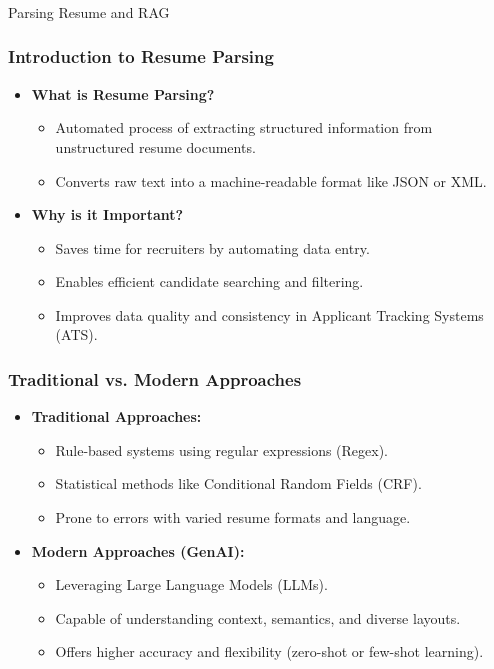 \begin{frame}[fragile]\frametitle{}
\begin{center}
{\Large Parsing Resume and RAG}

\end{center}
\end{frame}


\begin{frame}[fragile]\frametitle{Introduction to Resume Parsing}
    \begin{itemize}
        \item \textbf{What is Resume Parsing?}
        \begin{itemize}
            \item Automated process of extracting structured information from unstructured resume documents.
            \item Converts raw text into a machine-readable format like JSON or XML.
        \end{itemize}
        \item \textbf{Why is it Important?}
        \begin{itemize}
            \item Saves time for recruiters by automating data entry.
            \item Enables efficient candidate searching and filtering.
            \item Improves data quality and consistency in Applicant Tracking Systems (ATS).
        \end{itemize}
    \end{itemize}
\end{frame}

\begin{frame}[fragile]\frametitle{Traditional vs. Modern Approaches}
    \begin{itemize}
        \item \textbf{Traditional Approaches:}
        \begin{itemize}
            \item Rule-based systems using regular expressions (Regex).
            \item Statistical methods like Conditional Random Fields (CRF).
            \item Prone to errors with varied resume formats and language.
        \end{itemize}
        \item \textbf{Modern Approaches (GenAI):}
        \begin{itemize}
            \item Leveraging Large Language Models (LLMs).
            \item Capable of understanding context, semantics, and diverse layouts.
            \item Offers higher accuracy and flexibility (zero-shot or few-shot learning).
        \end{itemize}
    \end{itemize}
\end{frame}


